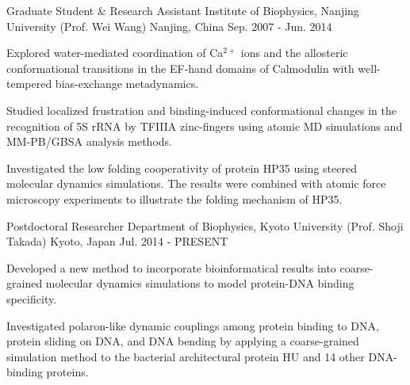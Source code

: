 

\begin{cventries}

  \cventry
  {Graduate Student \& Research Assistant} %
  {Institute of Biophysics, Nanjing University (Prof. Wei Wang)} %
  {Nanjing, China} %
  {Sep. 2007 - Jun. 2014} %
  {
    \begin{cvitems} %
    \item {Explored water-mediated coordination of Ca$^{2+}$ ions and the
        allosteric conformational transitions in the EF-hand domains of Calmodulin with
        well-tempered bias-exchange metadynamics.}
    \item {Studied localized frustration and binding-induced conformational
        changes in the recognition of 5S rRNA by TFIIIA zinc-fingers using atomic MD
        simulations and MM-PB/GBSA analysis methods.}
    \item {Investigated the low folding cooperativity of protein HP35 using
        steered molecular dynamics simulations.  The results were combined with atomic
        force microscopy experiments to illustrate the folding mechanism of HP35.}
    \end{cvitems}
  }

  \cventry
  {Postdoctoral Researcher} %
  {Department of Biophysics, Kyoto University (Prof. Shoji Takada)} %
  {Kyoto, Japan} %
  {Jul. 2014 - PRESENT} %
  {
    \begin{cvitems} %
    \item {Developed a new method to incorporate bioinformatical results into
        coarse-grained molecular dynamics simulations to model protein-DNA binding
        specificity.}
    \item {Investigated polaron-like dynamic couplings among protein binding to
        DNA, protein sliding on DNA, and DNA bending by applying a coarse-grained
        simulation method to the bacterial architectural protein HU and 14 other
        DNA-binding proteins.}
    \end{cvitems}
  }


\end{cventries}
